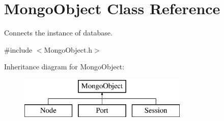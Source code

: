 \hypertarget{class_mongo_object}{}\section{Mongo\+Object Class Reference}
\label{class_mongo_object}


Connects the instance of database.  




{\ttfamily \#include $<$Mongo\+Object.\+h$>$}

Inheritance diagram for Mongo\+Object\+:\begin{figure}[H]
\begin{center}
\leavevmode
\includegraphics[height=2.000000cm]{class_mongo_object}
\end{center}
\end{figure}
